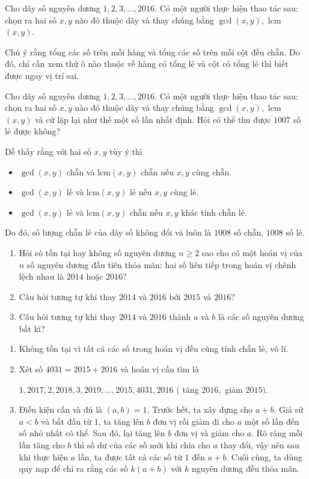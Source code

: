 \begin{bt}
	Cho dãy số nguyên dương $1,2,3, \ldots ,2016.$ Có một người thực hiện thao tác sau: chọn ra hai số $x,y$ nào đó thuộc dãy và thay chúng bằng $\gcd(x,y),$ lcm$(x,y)$.
	
	 Chú ý rằng tổng các số trên mỗi hàng và tổng các số trên mỗi cột đều chẵn. Do đó, chỉ cần xem thử ô nào thuộc về hàng có tổng lẻ và cột có tổng lẻ thì biết được ngay vị trí sai.
\end{bt}

\begin{bt}
	Cho dãy số nguyên dương $1,2,3, \ldots ,2016$. Có một người thực hiện thao tác sau: chọn ra hai số $x,y$ nào đó thuộc dãy và thay chúng bằng $\gcd(x,y),$ lcm$(x,y)$ và cứ lặp lại như thế một số lần nhất định. Hỏi có thể thu được $1007$ số lẻ được không?  
	
	 Dễ thấy rằng với hai số $x,y$ tùy ý thì
	\begin{itemize}
		\item $\gcd (x,y)$ chẵn và lcm$(x,y)$ chẵn nếu $x,y $ cùng chẵn.
		\item $\gcd (x,y)$ lẻ và lcm$(x,y)$ lẻ nếu $x,y $ cùng lẻ.
		\item $\gcd (x,y)$ lẻ và lcm$(x,y)$ chẵn nếu $x,y $ khác tính chẵn lẻ.
	\end{itemize}
	Do đó, số lượng chẵn lẻ của dãy số không đổi và luôn là $1008$ số chẵn, $1008$ số lẻ.
\end{bt}

\begin{bt}
	\begin{enumerate}
		\item Hỏi có tồn tại hay không số nguyên dương $n \ge 2$ sao cho có một hoán vị của $n$ số nguyên dương đầu tiên thỏa mãn: hai số liên tiếp trong hoán vị chênh lệch nhau là $2014$ hoặc $2016 ?$ 
		\item Câu hỏi tương tự khi thay $2014$ và $2016$ bởi $2015$ và $2016?$
		\item Câu hỏi tương tự khi thay $2014$ và $2016$ thành $a$ và $b$ là các số nguyên dương bất kì?
	\end{enumerate}	
	\begin{enumerate}
		\item Không tồn tại vì tất cả các số trong hoán vị đều cùng tính chẵn lẻ, vô lí.
		\item Xét số $4031=2015+2016$ và hoán vị cần tìm là\\
		\centerline{ $1,2017,2,2018,3,2019,\ldots, 2015,4031,2016  $ $($  tăng $ 2016,$ giảm $2015) .$ }
		\item Điều kiện cần và đủ là $(a,b)=1$. Trước hết, ta xây dựng cho $a+b$. Giả sử $a<b$ và bắt đầu từ $1$, ta tăng lên $b$ đơn vị rồi giảm đi cho $a$ một số lần đến số nhỏ nhất có thể. Sau đó, lại tăng lên $b$ đơn vị và giảm cho $a$.
		Rõ ràng mỗi lần tăng cho $b$ thì số dư của các số mới khi chia cho $a$ thay đổi, vậy nên sau khi thực hiện $a$ lần, ta được tất cả các số từ $1$ đến $a+b$. Cuối cùng, ta dùng quy nạp để chỉ ra rằng các số $k(a+b)$ với $k$ nguyên dương đều thỏa mãn.
	\end{enumerate}
\end{bt}	

